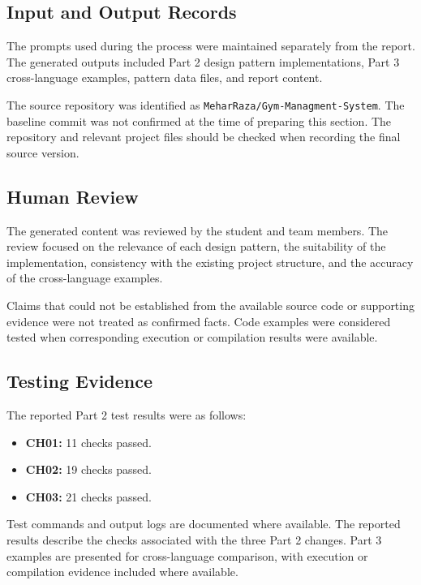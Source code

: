 \documentclass[11pt,a4paper]{article}
\begin{document}
\subsection{Input and Output Records}

The prompts used during the process were maintained separately
from the report. The generated outputs included Part 2 design
pattern implementations, Part 3 cross-language examples, pattern
data files, and report content.

The source repository was identified as
\texttt{MeharRaza/Gym-Managment-System}. The baseline commit
was not confirmed at the time of preparing this section.
The repository and relevant project files should be checked
when recording the final source version.

\subsection{Human Review}

The generated content was reviewed by the student and team
members. The review focused on the relevance of each design
pattern, the suitability of the implementation, consistency
with the existing project structure, and the accuracy of the
cross-language examples.

Claims that could not be established from the available source
code or supporting evidence were not treated as confirmed facts.
Code examples were considered tested when corresponding
execution or compilation results were available.

\subsection{Testing Evidence}

The reported Part 2 test results were as follows:

\begin{itemize}
    \item \textbf{CH01:} 11 checks passed.
    \item \textbf{CH02:} 19 checks passed.
    \item \textbf{CH03:} 21 checks passed.
\end{itemize}

Test commands and output logs are documented where available.
The reported results describe the checks associated with the
three Part 2 changes. Part 3 examples are presented for
cross-language comparison, with execution or compilation
evidence included where available.
\end{document}
